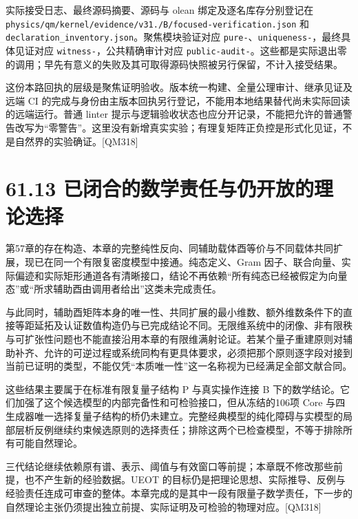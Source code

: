 \documentclass[
  11pt,
  oneside]{book}
\begin{document}
实际接受日志、最终源码摘要、源码与 olean 绑定及逐名库存分别登记在
\texttt{physics/\allowbreak qm/\allowbreak kernel/\allowbreak evidence/\allowbreak v31./\allowbreak B/\allowbreak focused-\allowbreak verification.\allowbreak json} 和
\texttt{declaration\_\allowbreak inventory.\allowbreak json}。聚焦模块验证对应
\texttt{pure-}、\allowbreak \texttt{uniqueness-}，最终具体见证对应
\texttt{witness-}，公共精确审计对应
\texttt{public-\allowbreak audit-}。这些都是实际退出零的调用；早先有意义的失败及其可取得源码快照被另行保留，不计入接受结果。

这份本路回执的层级是聚焦证明验收。版本统一构建、全量公理审计、继承见证及远端
CI
的完成与身份由主版本回执另行登记，不能用本地结果替代尚未实际回读的远端运行。普通
linter
提示与逻辑验收状态也应分开记录，不能把允许的普通警告改写为``零警告''。这里没有新增真实实验；有理复矩阵正负控是形式化见证，不是自然界的实验确证。{[}QM318{]}

\section{61.13 已闭合的数学责任与仍开放的理论选择}

第57章的存在构造、本章的完整纯性反向、同辅助载体酉等价与不同载体共同扩展，现已在同一个有限复密度模型中接通。纯态定义、Gram
因子、联合向量、实际偏迹和实际矩形通道各有清晰接口，结论不再依赖``所有纯态已经被假定为向量态''或``所求辅助酉由调用者给出''这类未完成责任。

与此同时，辅助酉矩阵本身的唯一性、共同扩展的最小维数、额外维数条件下的直接等距延拓及认证数值构造仍与已完成结论不同。无限维系统中的闭像、非有限秩与可扩张性问题也不能直接沿用本章的有限维满射论证。若某个量子重建原则对辅助补齐、允许的可逆过程或系统同构有更具体要求，必须把那个原则逐字段对接到当前已证明的类型，不能仅凭``本质唯一性''这一名称视为已经满足全部文献合同。

这些结果主要属于在标准有限复量子结构 P 与真实操作连接 B
下的数学结论。它们加强了这个候选模型的内部完备性和可检验接口，但从冻结的106项
Core
与四生成器唯一选择复量子结构的桥仍未建立。完整经典模型的纯化障碍与实模型的局部层析反例继续约束候选原则的选择责任；排除这两个已检查模型，不等于排除所有可能自然理论。

三代结论继续依赖原有谱、表示、阈值与有效窗口等前提；本章既不修改那些前提，也不产生新的经验数据。UEOT
的目标仍是把理论思想、实际推导、反例与经验责任连成可审查的整体。本章完成的是其中一段有限量子数学责任，下一步的自然理论主张仍须提出独立前提、实际证明及可检验的物理对应。{[}QM318{]}
\end{document}
